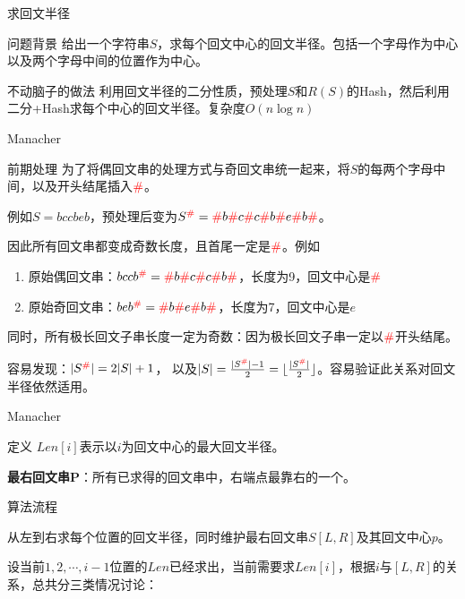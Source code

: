 \documentclass{ctexbeamer}		%
\newcommand{\redP}{{\color{red}\#}}
\begin{document}
\begin{frame}{求回文半径}
    
\begin{block}{问题背景}
给出一个字符串$S$，求每个回文中心的回文半径。包括一个字母作为中心以及两个字母中间的位置作为中心。
\end{block}    

\pause

\begin{block}{不动脑子的做法}
利用回文半径的二分性质，预处理$S$和$R(S)$的Hash，然后利用二分+Hash求每个中心的回文半径。复杂度$O(n\log n)$
\end{block}
\end{frame}

\begin{frame}{Manacher}
\begin{block}{前期处理}
为了将偶回文串的处理方式与奇回文串统一起来，将$S$的每两个字母中间，以及开头结尾插入$\redP$。

例如$S = bccbeb$，预处理后变为$S^{\redP} = \redP b\redP c\redP c\redP b\redP e\redP b\redP$。

\pause

因此所有回文串都变成奇数长度，且首尾一定是$\redP$。例如
\begin{enumerate}
    \item 原始偶回文串：$bccb^{\redP} = \redP b\redP c\redP c\redP b\redP$，长度为9，回文中心是$\redP$
    \item 原始奇回文串：$beb^{\redP} = \redP b\redP e\redP b\redP$，长度为7，回文中心是$e$
\end{enumerate}

\pause

同时，所有极长回文子串长度一定为奇数：因为极长回文子串一定以$\redP$开头结尾。

\pause

容易发现：$|S^{\redP}| = 2|S| + 1$，\hspace{2pt} 以及$|S| = \frac{|S^{\redP}| - 1}{2} = \lfloor\frac{|S^{\redP}|}{2}\rfloor$。容易验证此关系对回文半径依然适用。

\end{block}
    
\end{frame}


\begin{frame}{Manacher}

\begin{block}{定义}
$Len[i]$表示以$i$为回文中心的最大回文半径。

\textbf{最右回文串P}：所有已求得的回文串中，右端点最靠右的一个。

\end{block}

\pause

\begin{block}{算法流程}

从左到右求每个位置的回文半径，同时维护最右回文串$S[L,R]$及其回文中心$p$。

\pause

设当前$1,2,\cdots, i-1$位置的$Len$已经求出，当前需要求$Len[i]$，根据$i$与$[L,R]$的关系，总共分三类情况讨论：

\end{block}
\end{frame}
\end{document}
